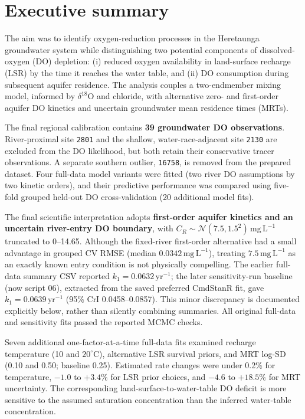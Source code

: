 \documentclass[11pt,a4paper]{article}
\newcommand{\site}[1]{\texttt{#1}}
\newcommand{\mgL}{\mathrm{mg\,L^{-1}}}
\newcommand{\yr}{\mathrm{yr}}
\begin{document}
\tableofcontents
\newpage

\section{Executive summary}
The aim was to identify oxygen-reduction processes in the Heretaunga groundwater system while distinguishing two potential components of dissolved-oxygen (DO) depletion: (i) reduced oxygen availability in land-surface recharge (LSR) by the time it reaches the water table, and (ii) DO consumption during subsequent aquifer residence. The analysis couples a two-endmember mixing model, informed by \(\delta^{18}\mathrm{O}\) and chloride, with alternative zero- and first-order aquifer DO kinetics and uncertain groundwater mean residence times (MRTs).

The final regional calibration contains \textbf{39 groundwater DO observations}. River-proximal site \site{2801} and the shallow, water-race-adjacent site \site{2130} are excluded from the DO likelihood, but both retain their conservative tracer observations. A separate southern outlier, \site{16758}, is removed from the prepared dataset. Four full-data model variants were fitted (two river DO assumptions by two kinetic orders), and their predictive performance was compared using five-fold grouped held-out DO cross-validation (20 additional model fits).

The final scientific interpretation adopts \textbf{first-order aquifer kinetics and an uncertain river-entry DO boundary}, with $C_R\sim\mathcal N(7.5,1.5^2)\,\mgL$ truncated to 0--14.65. Although the fixed-river first-order alternative had a small advantage in grouped CV RMSE (median $0.0342\,\mgL$), treating $7.5\,\mgL$ as an exactly known entry condition is not physically compelling. The earlier full-data summary CSV reported $k_1=0.0632\,\yr^{-1}$; the later sensitivity-run baseline (now script 06), extracted from the saved preferred CmdStanR fit, gave $k_1=0.0639\,\yr^{-1}$ (95\% CrI 0.0458--0.0857). This minor discrepancy is documented explicitly below, rather than silently combining summaries. All original full-data and sensitivity fits passed the reported MCMC checks.

Seven additional one-factor-at-a-time full-data fits examined recharge temperature (10 and $20^\circ$C), alternative LSR survival priors, and MRT log-SD (0.10 and 0.50; baseline 0.25). Estimated rate changes were under 0.2\% for temperature, $-1.0$ to $+3.4$\% for LSR prior choices, and $-4.6$ to $+18.5$\% for MRT uncertainty. The corresponding land-surface-to-water-table DO deficit is more sensitive to the assumed saturation concentration than the inferred water-table concentration.
\end{document}
